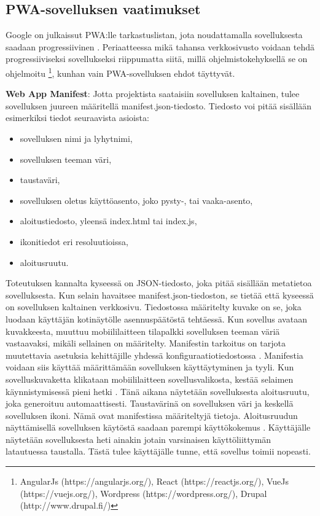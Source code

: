 \documentclass{tktltiki}
\begin{document}
\subsection{PWA-sovelluksen vaatimukset}

Google on julkaissut PWA:lle tarkastuslistan, jota noudattamalla sovelluksesta saadaan progressiivinen \cite{Google}. Periaatteessa mikä tahansa verkkosivusto voidaan tehdä progressiiviseksi sovellukseksi \cite{hiltunen2018creating} riippumatta siitä, millä ohjelmistokehyksellä se on ohjelmoitu \footnote[1]{AngularJs (https://angularjs.org/), React (https://reactjs.org/), VueJs (https://vuejs.org/), Wordpress (https://wordpress.org/), Drupal (http://www.drupal.fi/)}, kunhan vain PWA-sovelluksen ehdot täyttyvät.

\textbf{Web App Manifest}: Jotta projektista saataisiin sovelluksen kaltainen, tulee sovelluksen juureen määritellä manifest.json-tiedosto. Tiedosto voi pitää sisällään esimerkiksi tiedot seuraavista asioista:

\begin{itemize}
  \item sovelluksen nimi ja lyhytnimi,
  \item sovelluksen teeman väri,
  \item taustaväri,
  \item sovelluksen oletus käyttöasento, joko pysty-, tai vaaka-asento,
  \item aloitustiedosto, yleensä index.html tai index.js,
  \item ikonitiedot eri resoluutioissa,
  \item aloitusruutu.
\end{itemize}

Toteutuksen kannalta kyseessä on JSON-tiedosto, joka pitää sisällään metatietoa sovelluksesta. Kun selain havaitsee manifest.json-tiedoston, se tietää että kyseessä on sovelluksen kaltainen verkkosivu. Tiedostossa määritelty kuvake on se, joka luodaan käyttäjän kotinäytölle asennuspäätöstä tehtäessä. Kun sovellus avataan kuvakkeesta, muuttuu mobiililaitteen tilapalkki sovelluksen teeman väriä vastaavaksi, mikäli sellainen on määritelty. Manifestin tarkoitus on tarjota muutettavia asetuksia kehittäjille yhdessä konfiguraatiotiedostossa \cite{biorn2017progressive}. Manifestia voidaan siis käyttää määrittämään sovelluksen käyttäytyminen ja tyyli.
Kun sovelluskuvaketta klikataan mobiililaitteen sovellusvalikosta, kestää selaimen käynnistymisessä pieni hetki \cite{hiltunen2018creating}. Tänä aikana näytetään sovelluksesta aloitusruutu, joka generoituu automaattisesti. Taustavärinä on sovelluksen väri ja keskellä sovelluksen ikoni. Nämä ovat manifestissa määriteltyjä tietoja. Aloitusruudun näyttämisellä sovelluksen käytöstä saadaan parempi käyttökokemus \cite{hiltunen2018creating}. Käyttäjälle näytetään sovelluksesta heti ainakin jotain varsinaisen käyttöliittymän latautuessa taustalla. Tästä tulee käyttäjälle tunne, että sovellus toimii nopeasti.
\end{document}
